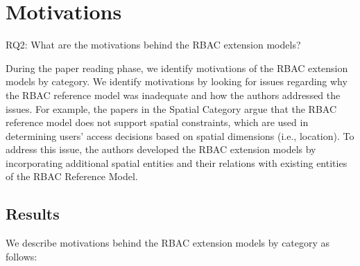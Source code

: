 \section{Motivations} \label{sec:motivations}

RQ2: What are the motivations behind the RBAC extension models?


During the paper reading phase, we identify motivations of the RBAC extension models by category. We identify motivations by looking for issues regarding why the RBAC reference model was inadequate and how the authors addressed the issues. For example, the papers in the Spatial Category argue that the RBAC reference model does not support spatial constraints, which are used in determining users' access decisions based on spatial dimensions (i.e., location). To address this issue, the authors developed the RBAC extension models by incorporating additional spatial entities and their relations with existing entities of the RBAC Reference Model. 


\subsection{Results}

We describe motivations behind the RBAC extension models by category as follows:

